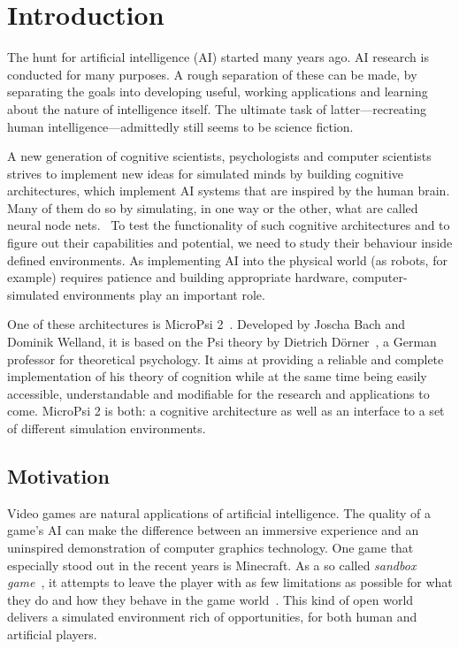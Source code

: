 \chapter{Introduction}
\label{chap:1}

The hunt for artificial intelligence (AI) started many years ago. AI research is conducted for many purposes. A rough separation of these can be made, by separating the goals into developing useful, working applications and learning about the nature of intelligence itself. The ultimate task of latter---recreating human intelligence---admittedly still seems to be science fiction.

A new generation of cognitive scientists, psychologists and computer scientists strives to implement new ideas for simulated minds by building cognitive architectures, which implement AI systems that are inspired by the human brain. Many of them do so by simulating, in one way or the other, what are called neural node nets.~\cite{Goertzel201030} To test the functionality of such cognitive architectures and to figure out their capabilities and potential, we need to study their behaviour inside defined environments. As implementing AI into the physical world (as robots, for example) requires patience and building appropriate hardware, computer-simulated environments play an important role.

One of these architectures is MicroPsi 2~\cite{conf/agi/Bach12}. Developed by Joscha Bach and Dominik Welland, it is based on the Psi theory by Dietrich Dörner~\cite{Doerner98}, a German professor for theoretical psychology. It aims at providing a reliable and complete implementation of his theory of cognition while at the same time being easily accessible, understandable and modifiable for the research and applications to come. MicroPsi 2 is both: a cognitive architecture as well as an interface to a set of different simulation environments.

\section{Motivation}

Video games are natural applications of artificial intelligence. The quality of a game's AI can make the difference between an immersive experience and an uninspired demonstration of computer graphics technology. One game that especially stood out in the recent years is Minecraft. As a so called \emph{sandbox game}~\cite{Duncan:2011:MBC:2207096.2207097}, it attempts to leave the player with as few limitations as possible for what they do and how they behave in the game world~\cite{doi:10.1162/dmal.9780262693646.167}. This kind of open world delivers a simulated environment rich of opportunities, for both human and artificial players. 

